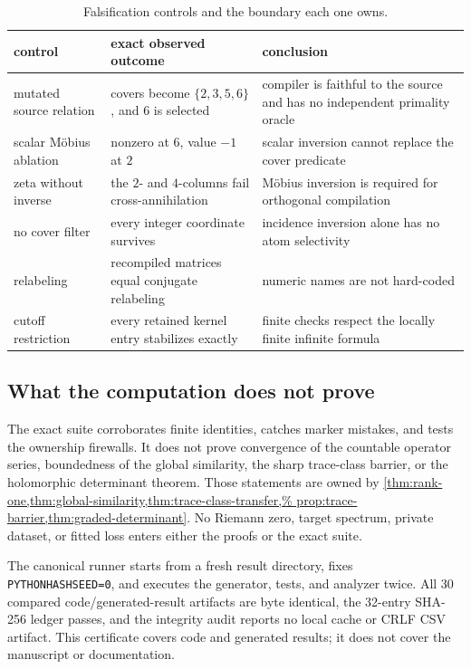 \begin{table}[t]
\centering
\small
\caption{Falsification controls and the boundary each one owns.}
\label{tab:falsification-controls}
\begin{tabularx}{\textwidth}{L{37mm} L{45mm} Y}
\toprule
control & exact observed outcome & conclusion \\
\midrule
mutated source relation
& covers become \(\{2,3,5,6\}\), and \(6\) is selected
& compiler is faithful to the source and has no independent primality oracle \\
scalar Möbius ablation
& nonzero at \(6\), value \(-1\) at \(2\)
& scalar inversion cannot replace the cover predicate \\
zeta without inverse
& the \(2\)- and \(4\)-columns fail cross-annihilation
& Möbius inversion is required for orthogonal compilation \\
no cover filter
& every integer coordinate survives
& incidence inversion alone has no atom selectivity \\
relabeling
& recompiled matrices equal conjugate relabeling
& numeric names are not hard-coded \\
cutoff restriction
& every retained kernel entry stabilizes exactly
& finite checks respect the locally finite infinite formula \\
\bottomrule
\end{tabularx}
\end{table}

\subsection{What the computation does not prove}

The exact suite corroborates finite identities, catches marker mistakes, and
tests the ownership firewalls. It does not prove convergence of the countable
operator series, boundedness of the global similarity, the sharp trace-class
barrier, or the holomorphic determinant theorem. Those statements are owned
by \cref{thm:rank-one,thm:global-similarity,thm:trace-class-transfer,%
prop:trace-barrier,thm:graded-determinant}. No Riemann zero, target spectrum,
private dataset, or fitted loss enters either the proofs or the exact suite.

The canonical runner starts from a fresh result directory, fixes
\texttt{PYTHONHASHSEED=0}, and executes the generator, tests, and analyzer
twice. All 30 compared code/generated-result artifacts are byte identical,
the 32-entry SHA-256 ledger passes, and the integrity audit reports no local
cache or CRLF CSV artifact. This certificate covers code and generated
results; it does not cover the manuscript or documentation.
